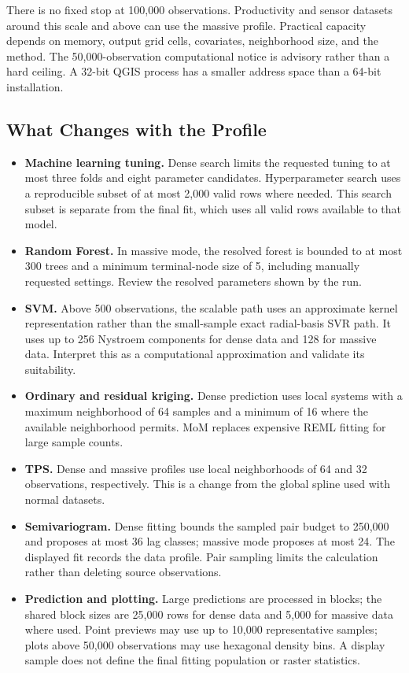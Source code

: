 \documentclass[11pt,a4paper]{article}
\begin{document}
There is no fixed stop at 100,000 observations. Productivity and sensor datasets around this scale and above can use the massive profile. Practical capacity depends on memory, output grid cells, covariates, neighborhood size, and the method. The 50,000-observation computational notice is advisory rather than a hard ceiling. A 32-bit QGIS process has a smaller address space than a 64-bit installation.

\subsection{What Changes with the Profile}

\begin{itemize}
    \item \textbf{Machine learning tuning.} Dense search limits the requested tuning to at most three folds and eight parameter candidates. Hyperparameter search uses a reproducible subset of at most 2,000 valid rows where needed. This search subset is separate from the final fit, which uses all valid rows available to that model.
    \item \textbf{Random Forest.} In massive mode, the resolved forest is bounded to at most 300 trees and a minimum terminal-node size of 5, including manually requested settings. Review the resolved parameters shown by the run.
    \item \textbf{SVM.} Above 500 observations, the scalable path uses an approximate kernel representation rather than the small-sample exact radial-basis SVR path. It uses up to 256 Nystroem components for dense data and 128 for massive data. Interpret this as a computational approximation and validate its suitability.
    \item \textbf{Ordinary and residual kriging.} Dense prediction uses local systems with a maximum neighborhood of 64 samples and a minimum of 16 where the available neighborhood permits. MoM replaces expensive REML fitting for large sample counts.
    \item \textbf{TPS.} Dense and massive profiles use local neighborhoods of 64 and 32 observations, respectively. This is a change from the global spline used with normal datasets.
    \item \textbf{Semivariogram.} Dense fitting bounds the sampled pair budget to 250,000 and proposes at most 36 lag classes; massive mode proposes at most 24. The displayed fit records the data profile. Pair sampling limits the calculation rather than deleting source observations.
    \item \textbf{Prediction and plotting.} Large predictions are processed in blocks; the shared block sizes are 25,000 rows for dense data and 5,000 for massive data where used. Point previews may use up to 10,000 representative samples; plots above 50,000 observations may use hexagonal density bins. A display sample does not define the final fitting population or raster statistics.
\end{itemize}
\end{document}
